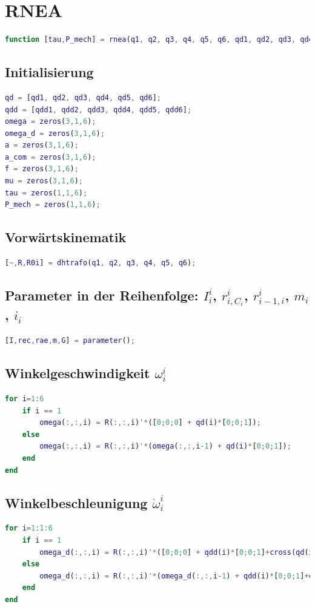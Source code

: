 \section{RNEA}
\label{add:rnea}
%
\begin{lstlisting}[language=Matlab, numbers=none]
function [tau,P_mech] = rnea(q1, q2, q3, q4, q5, q6, qd1, qd2, qd3, qd4, qd5, qd6, qdd1, qdd2, qdd3, qdd4, qdd5, qdd6)
\end{lstlisting}
%
\subsection{Initialisierung}
%
\begin{lstlisting}[language=Matlab, numbers=none]
qd = [qd1, qd2, qd3, qd4, qd5, qd6];
qdd = [qdd1, qdd2, qdd3, qdd4, qdd5, qdd6];
omega = zeros(3,1,6);
omega_d = zeros(3,1,6);
a = zeros(3,1,6);
a_com = zeros(3,1,6);
f = zeros(3,1,6);
mu = zeros(3,1,6);
tau = zeros(1,1,6);
P_mech = zeros(1,1,6);
\end{lstlisting}
%
\subsection{Vorwärtskinematik}
%
\begin{lstlisting}[language=Matlab, numbers=none]
[~,R,R0i] = dhtrafo(q1, q2, q3, q4, q5, q6);
\end{lstlisting}
%
\subsection{Parameter in der Reihenfolge: $I^{i}_{i}$, $r^{i}_{i,C_i}$, $r^{i}_{i-1,i}$, $m_i$, $i_i$}
%
\begin{lstlisting}[language=Matlab, numbers=none]
[I,rec,rae,m,G] = parameter();
\end{lstlisting}
%
\subsection{Winkelgeschwindigkeit $\omega^{i}_i$}
%
\begin{lstlisting}[language=Matlab, numbers=none]
for i=1:6
	if i == 1
		omega(:,:,i) = R(:,:,i)'*([0;0;0] + qd(i)*[0;0;1]);
	else
		omega(:,:,i) = R(:,:,i)'*(omega(:,:,i-1) + qd(i)*[0;0;1]);
	end
end
\end{lstlisting}
%
\subsection{Winkelbeschleunigung $\dot\omega^{i}_i$}
%
\begin{lstlisting}[language=Matlab, numbers=none]
for i=1:1:6
	if i == 1
		omega_d(:,:,i) = R(:,:,i)'*([0;0;0] + qdd(i)*[0;0;1]+cross(qd(i)*[0;0;0], [0;0;1]));
	else
		omega_d(:,:,i) = R(:,:,i)'*(omega_d(:,:,i-1) + qdd(i)*[0;0;1]+cross(qd(i)*omega(:,:,i-1), [0;0;1]));
	end
end
\end{lstlisting}
%
